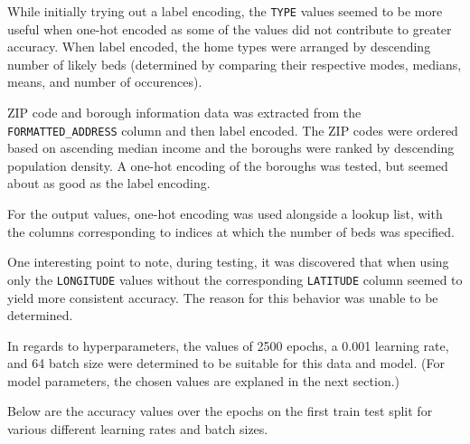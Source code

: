 \documentclass[12pt]{article}
\begin{document}
While initially trying out a label encoding, the \verb|TYPE| values seemed to be more useful when one-hot encoded as some of the values did not contribute to greater accuracy. When label encoded, the home types were arranged by descending number of likely beds (determined by comparing their respective modes, medians, means, and number of occurences).

ZIP code and borough information data was extracted from the \verb|FORMATTED_ADDRESS| column and then label encoded. The ZIP codes were ordered based on ascending median income and the boroughs were ranked by descending population density. A one-hot encoding of the boroughs was tested, but seemed about as good as the label encoding.

For the output values, one-hot encoding was used alongside a lookup list, with the columns corresponding to indices at which the number of beds was specified.

One interesting point to note, during testing, it was discovered that when using only the \verb|LONGITUDE| values without the corresponding \verb|LATITUDE| column seemed to yield more consistent accuracy. The reason for this behavior was unable to be determined.

\pagebreak


In regards to hyperparameters, the values of 2500 epochs, a 0.001 learning rate, and 64 batch size were determined to be suitable for this data and model. (For model parameters, the chosen values are explaned in the next section.)

Below are the accuracy values over the epochs on the first train test split for various different learning rates and batch sizes.
\end{document}
